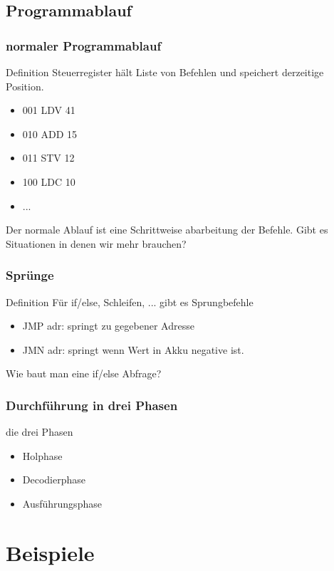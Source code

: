 \documentclass{beamer}
\begin{document}
\subsection{Programmablauf}
\begin{frame}
	\frametitle{normaler Programmablauf}
	\begin{block}{Definition}
		Steuerregister hält Liste von Befehlen und speichert derzeitige Position. \\
		\begin{itemize}
			\item 001 LDV 41
			\item 010 ADD 15
			\item 011 STV 12
			\item 100 LDC 10
			\item ...
		\end{itemize}
		Der normale Ablauf ist eine Schrittweise abarbeitung der Befehle. Gibt es Situationen in denen wir mehr brauchen?
	\end{block}
\end{frame}

\begin{frame}
	\frametitle{Spr\"unge}
	\begin{block}{Definition}
		Für if/else, Schleifen, ... gibt es Sprungbefehle \\
		\begin{itemize}
			\item JMP adr: springt zu gegebener Adresse
			\item JMN adr: springt wenn Wert in Akku negative ist.
		\end{itemize}
		Wie baut man eine if/else Abfrage?
	\end{block}
\end{frame}

\begin{frame}
	\frametitle{Durchf\"uhrung in drei Phasen}
	\begin{block}{die drei Phasen}
		\begin{itemize}
			\item Holphase
			\item Decodierphase
			\item Ausführungsphase
		\end{itemize}
	\end{block}
\end{frame}

\section{Beispiele}
\end{document}
